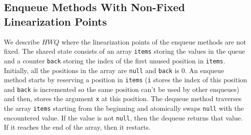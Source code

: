 \subsection{Enqueue Methods With Non-Fixed Linearization Points}
\vspace{-1mm}
We describe $\mathit{HWQ}$ where the linearization points of the enqueue methods are not fixed.
The shared state consists of an array {\tt items} storing the values in the queue and a counter {\tt back} storing the index of the first unused position in {\tt items}. Initially, all the positions in the array are {\tt null} and {\tt back} is 0.
An enqueue method starts by reserving a position in {\tt items} ({\tt i} stores the index of this position and {\tt back} is incremented so the same position can't be used by other enqueues) and then, stores the argument {\tt x} at this position. The dequeue method traverses the array {\tt items} starting from the beginning and atomically swaps {\tt null} with the encountered value. If the value is not {\tt null}, then the dequeue returns that value. If it reaches the end of the array, then it restarts.

